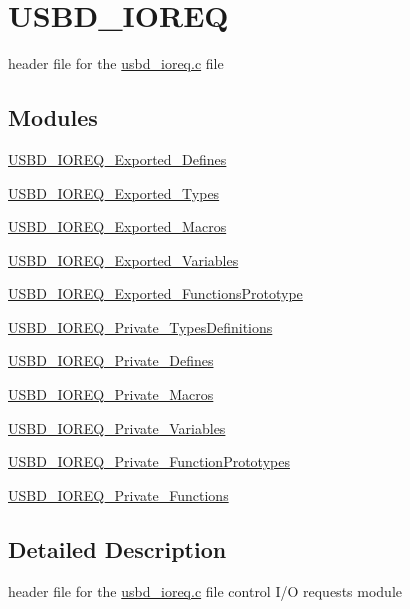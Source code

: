 \hypertarget{group___u_s_b_d___i_o_r_e_q}{\section{U\-S\-B\-D\-\_\-\-I\-O\-R\-E\-Q}
\label{group___u_s_b_d___i_o_r_e_q}
}


header file for the \hyperlink{usbd__ioreq_8c}{usbd\-\_\-ioreq.\-c} file  


\subsection*{Modules}
\begin{DoxyCompactItemize}
\item 
\hyperlink{group___u_s_b_d___i_o_r_e_q___exported___defines}{U\-S\-B\-D\-\_\-\-I\-O\-R\-E\-Q\-\_\-\-Exported\-\_\-\-Defines}
\item 
\hyperlink{group___u_s_b_d___i_o_r_e_q___exported___types}{U\-S\-B\-D\-\_\-\-I\-O\-R\-E\-Q\-\_\-\-Exported\-\_\-\-Types}
\item 
\hyperlink{group___u_s_b_d___i_o_r_e_q___exported___macros}{U\-S\-B\-D\-\_\-\-I\-O\-R\-E\-Q\-\_\-\-Exported\-\_\-\-Macros}
\item 
\hyperlink{group___u_s_b_d___i_o_r_e_q___exported___variables}{U\-S\-B\-D\-\_\-\-I\-O\-R\-E\-Q\-\_\-\-Exported\-\_\-\-Variables}
\item 
\hyperlink{group___u_s_b_d___i_o_r_e_q___exported___functions_prototype}{U\-S\-B\-D\-\_\-\-I\-O\-R\-E\-Q\-\_\-\-Exported\-\_\-\-Functions\-Prototype}
\item 
\hyperlink{group___u_s_b_d___i_o_r_e_q___private___types_definitions}{U\-S\-B\-D\-\_\-\-I\-O\-R\-E\-Q\-\_\-\-Private\-\_\-\-Types\-Definitions}
\item 
\hyperlink{group___u_s_b_d___i_o_r_e_q___private___defines}{U\-S\-B\-D\-\_\-\-I\-O\-R\-E\-Q\-\_\-\-Private\-\_\-\-Defines}
\item 
\hyperlink{group___u_s_b_d___i_o_r_e_q___private___macros}{U\-S\-B\-D\-\_\-\-I\-O\-R\-E\-Q\-\_\-\-Private\-\_\-\-Macros}
\item 
\hyperlink{group___u_s_b_d___i_o_r_e_q___private___variables}{U\-S\-B\-D\-\_\-\-I\-O\-R\-E\-Q\-\_\-\-Private\-\_\-\-Variables}
\item 
\hyperlink{group___u_s_b_d___i_o_r_e_q___private___function_prototypes}{U\-S\-B\-D\-\_\-\-I\-O\-R\-E\-Q\-\_\-\-Private\-\_\-\-Function\-Prototypes}
\item 
\hyperlink{group___u_s_b_d___i_o_r_e_q___private___functions}{U\-S\-B\-D\-\_\-\-I\-O\-R\-E\-Q\-\_\-\-Private\-\_\-\-Functions}
\end{DoxyCompactItemize}


\subsection{Detailed Description}
header file for the \hyperlink{usbd__ioreq_8c}{usbd\-\_\-ioreq.\-c} file control I/\-O requests module